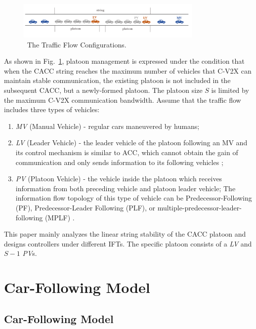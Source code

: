\documentclass[journal]{IEEEtran}
\begin{document}
\begin{figure}
\centering
\includegraphics[width=9cm]{fig2.png}
\caption{~The Traffic Flow Configurations.} 
\label{Figure2}
\end{figure}

As shown in Fig.~\ref{Figure2}, platoon management is expressed under the condition that when the CACC string reaches the maximum number of vehicles that C-V2X can maintain stable communication, the existing platoon is not included in the subsequent CACC, but a newly-formed platoon. The platoon size $S$ is limited by the maximum C-V2X communication bandwidth. Assume that the traffic flow includes three types of vehicles:


\begin{enumerate}
	\item \emph{MV} (Manual Vehicle) - regular cars maneuvered by humans;
	\item \emph{LV} (Leader Vehicle) - the leader vehicle of the platoon following an MV and its control mechanism is similar to ACC, which cannot obtain the gain of communication and only sends information to its following vehicles \citep{zheng2014influence};
	\item \emph{PV} (Platoon Vehicle) - the vehicle inside the platoon which receives information from both preceding vehicle and platoon leader vehicle; The information flow topology of this type of vehicle can be Predecessor-Following (PF), Predecessor-Leader Following (PLF), or multiple-predecessor-leader-following (MPLF) \citep{zheng2014influence}.
\end{enumerate}


This paper mainly analyzes the linear string stability of the CACC platoon and designs controllers under different IFTs. The specific platoon consists of a \emph{LV} and $S-1$ \emph{PV}s.

\section{Car-Following Model}
\label{Section 3}
\subsection{Car-Following Model}
\end{document}
